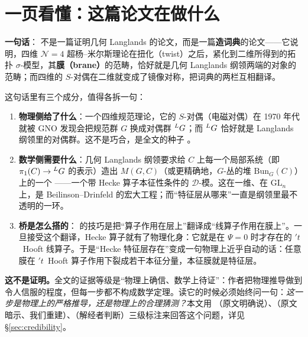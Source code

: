 
\section{一页看懂：这篇论文在做什么}

\begin{keyidea}
\textbf{一句话}：\kw{} 不是一篇证明几何 Langlands 的论文，而是一篇\textbf{造词典}的论文——它说明，四维 $\mathcal{N}=4$ 超杨--米尔斯理论在扭化（twist）之后，紧化到二维所得到的拓扑 $\sigma$-模型，其\textbf{膜（brane）}的范畴，恰好就是几何 Langlands 纲领两端的对象的范畴；而四维的 $S$-对偶在二维就变成了镜像对称，把词典的两栏互相翻译。
\end{keyidea}

这句话里有三个成分，值得各拆一句：

\begin{enumerate}[label=(\arabic*)]
\item \textbf{物理侧给了什么}：一个四维规范理论，它的 $S$-对偶（电磁对偶）在 1970 年代就被 GNO 发现会把规范群 $G$ 换成对偶群 ${}^{L}G$；而 ${}^{L}G$ 恰好就是 Langlands 纲领里的对偶群。这不是巧合，是全文的种子 \pA。
\item \textbf{数学侧需要什么}：几何 Langlands 纲领要求给 $C$ 上每一个局部系统（即 $\pi_1(C)\to{}^{L}G$ 的表示）造出 $M(G,C)$（或更精确地，$G$-丛的堆 $\mathrm{Bun}_G(C)$）上的一个 ——一个带 Hecke 算子本征性条件的 $\mathcal{D}$-模。这在一维、在 $\mathrm{GL}_n$ 上，是 Beilinson--Drinfeld 的宏大工程；而“特征层从哪来”一直是纲领里最不透明的一环。
\item \textbf{桥是怎么搭的}：\kw{} 的技巧是把“算子作用在层上”翻译成“线算子作用在膜上”。一旦接受这个翻译，Hecke 算子就有了物理化身：它就是在 $\Psi=0$ 时才存在的 $'t$~Hooft 线算子。于是“Hecke 特征层存在”变成一句物理上近乎自动的话：任意膜在 $'t$~Hooft 算子作用下裂成若干本征分量，本征膜就是特征层。
\end{enumerate}

\begin{warn}
\textbf{这不是证明。}全文的证据等级是“物理上确信、数学上待证”：作者把物理推导做到令人信服的程度，但每一步都不构成数学定理。读它的时候必须始终问一句：\emph{这一步是物理上的严格推导，还是物理上的合理猜测？}本文用 \pA{}（原文明确说）、\pB{}（原文暗示、我们重建）、\pC{}（解经者判断）三级标注来回答这个问题，详见 \S\ref{sec:credibility}。
\end{warn}

